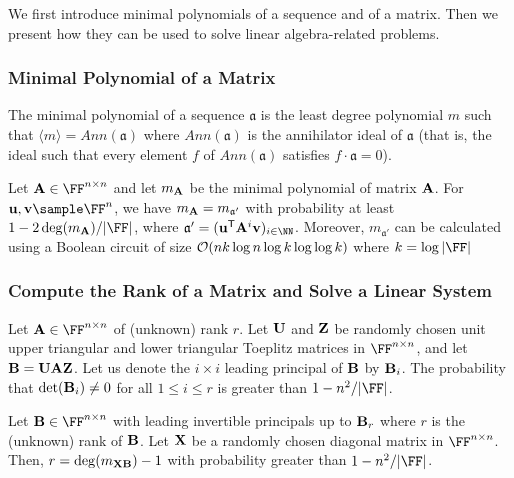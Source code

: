 We first introduce minimal polynomials of a sequence and of a matrix. Then we present how they can be used to solve linear algebra-related problems.

\subsubsection{Minimal Polynomial of a Matrix}
The minimal polynomial of a sequence $\mathfrak{a}$ is the least degree polynomial $m$ such that $\langle m\rangle=\mathit{Ann}(\mathfrak a)$ where $\mathit{Ann}(\mathfrak a)$ is the annihilator ideal of $\mathfrak a$ (that is, the ideal such that every element $f$ of $\mathit{Ann}(\mathfrak a)$ satisfies $f\cdot \mathfrak a=0$).

\begin{lemma}
\label{lemma:minpolymatrix}
Let $\An\in\FF^{n\times n}$ and let $m_{\mathbf{A}}$ be the minimal polynomial of matrix $\mathbf{A}$.
For $\un,\vn\sample \FF^n$, we have $m_{\mathbf{A}} = m_{\mathfrak{a}'}$ with probability
at least $1-2\deg(m_\An)/|\FF|$, where $\mathfrak{a}'=(\un^{\mathsf{T}} \An^i \vn)_{i\in\NN}$. Moreover, $m_{\mathfrak{a}'}$ can be calculated using a Boolean circuit of size $\mathcal{O}(nk\log n\log k\log\log k)$ where $k=\log|\FF|$%
\end{lemma}


\subsubsection{Compute the Rank of a Matrix and Solve a Linear System}\label{sec:rank-ls}


\begin{lemma}\label{lem:rank-1}
Let $\An\in \FF^{n\times n}$ of (unknown) rank $r$. Let $\mathbf{U}$ and $\mathbf{Z}$ be
randomly chosen unit upper triangular and lower triangular Toeplitz matrices in
$\FF^{n\times n}$, and let $\mathbf{B}=\mathbf{U}\mathbf{A}\mathbf{Z}$. Let us denote the $i\times i$ leading principal of $\mathbf{B}$ by $\mathbf{B}_i$. The
probability that $\det(\mathbf{B}_i) \neq 0$ for all $1\leq i\leq r$ is greater than $1-n^2/|\FF|$.
\end{lemma}

\begin{lemma}\label{lem:rank-2}
Let $\Bn\in \FF^{n\times n}$ with leading invertible principals up to $\mathbf{B}_r$
where $r$ is the (unknown) rank of $\mathbf{B}$. Let $\mathbf{X}$ be a randomly chosen diagonal matrix
in $\FF^{n\times n}$. Then, $r = \deg(m_{\mathbf{X}\mathbf{B}})-1$ with probability greater than $1-n^2/|\FF|$.
\end{lemma}

